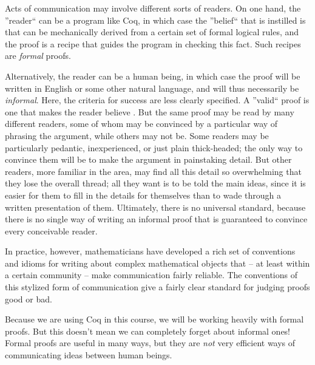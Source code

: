 \documentclass[12pt]{report}
\begin{document}
    Acts of communication may involve different sorts of readers.  On
    one hand, the ''reader`` can be a program like Coq, in which case
    the ''belief`` that is instilled is that  can be mechanically
    derived from a certain set of formal logical rules, and the proof
    is a recipe that guides the program in checking this fact.  Such
    recipes are \textit{formal} proofs.


    Alternatively, the reader can be a human being, in which case the
    proof will be written in English or some other natural language,
    and will thus necessarily be \textit{informal}.  Here, the criteria for
    success are less clearly specified.  A ''valid`` proof is one that
    makes the reader believe .  But the same proof may be read by
    many different readers, some of whom may be convinced by a
    particular way of phrasing the argument, while others may not be.
    Some readers may be particularly pedantic, inexperienced, or just
    plain thick-headed; the only way to convince them will be to make
    the argument in painstaking detail.  But other readers, more
    familiar in the area, may find all this detail so overwhelming
    that they lose the overall thread; all they want is to be told the
    main ideas, since it is easier for them to fill in the details for
    themselves than to wade through a written presentation of them.
    Ultimately, there is no universal standard, because there is no
    single way of writing an informal proof that is guaranteed to
    convince every conceivable reader.


    In practice, however, mathematicians have developed a rich set of
    conventions and idioms for writing about complex mathematical
    objects that -- at least within a certain community -- make
    communication fairly reliable.  The conventions of this stylized
    form of communication give a fairly clear standard for judging
    proofs good or bad.


    Because we are using Coq in this course, we will be working
    heavily with formal proofs.  But this doesn't mean we can
    completely forget about informal ones!  Formal proofs are useful
    in many ways, but they are \textit{not} very efficient ways of
    communicating ideas between human beings. 
\end{document}
